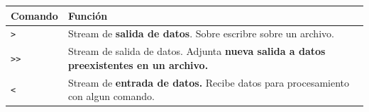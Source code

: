 \documentclass[
  spanish,
  12pt,
  letterpaper,
  DIV=11,
  numbers=noendperiod]{scrreprt}
\newcounter{none} %
\begin{document}
{\def\LTcaptype{none} %
\begin{longtable}[]{@{}
  >{\raggedright\arraybackslash}p{}
  >{\raggedright\arraybackslash}p{}@{}}
\toprule\noalign{}
\begin{minipage}[b]{\linewidth}\raggedright
\textbf{Comando}
\end{minipage} & \begin{minipage}[b]{\linewidth}\raggedright
\textbf{Función}
\end{minipage} \\
\midrule\noalign{}
\endhead
\bottomrule\noalign{}
\endlastfoot
\texttt{\textgreater{}} & Stream de \textbf{salida de datos}. Sobre
escribre sobre un archivo. \\
\texttt{\textgreater{}\textgreater{}} & Stream de salida de datos.
Adjunta \textbf{nueva salida a datos preexistentes en un archivo.} \\
\texttt{\textless{}} & Stream de \textbf{entrada de datos.} Recibe datos
para procesamiento con algun comando. \\
\end{longtable}
}
\end{document}
